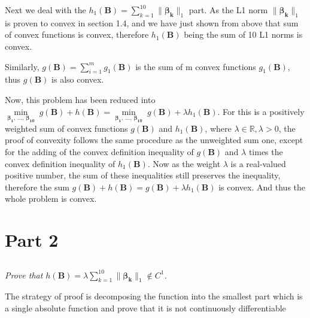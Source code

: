 \documentclass[12pt]{article}
\numberwithin{equation}{section}
\theoremstyle{remark}
\newcommand{\R}{\mathbb R} %
\newcommand{\vect}[1]{\boldsymbol{#1}}
\newcommand{\norm}[2]{\|#1\|_{#2}}
\begin{document}
\medskip
Next we deal with the $h_{1}(\vect{B}) = \sum\limits_{k = 1}^{10} \norm{\vect{\beta_k}}{1}$ part. As the L1 norm $\norm{\vect{\beta_k}}{1}$ is proven to convex in section 1.4, and we have just shown from above that sum of convex functions is convex, therefore $h_{1}(\vect{B})$ being the sum of 10 L1 norms is convex.

\medskip
Similarly, $g(\vect{B}) = \sum\limits_{i = 1}^m g_{1}(\vect{B})$ is the sum of m convex functions $g_{1}(\vect{B})$, thus $g(\vect{B})$ is also convex.

\medskip
Now, this problem has been reduced into $\min\limits_{\vect{\beta_1}, \, \ldots, \, \vect{\beta_{10}}} \; g(\vect{B}) + h(\vect{B}) = \min\limits_{\vect{\beta_1}, \, \ldots, \, \vect{\beta_{10}}} \; g(\vect{B}) + \lambda h_{1}(\vect{B})$. For this is a positively weighted sum of convex functions $g(\vect{B})$ and $h_{1}(\vect{B})$, where $\lambda \in \R, \lambda > 0$, the proof of convexity follows the same procedure as the unweighted sum one, except for the adding of the convex definition inequality of $g(\vect{B})$ and $\lambda$ times the convex definition inequality of $h_{1}(\vect{B})$. Now as the weight $\lambda$ is a real-valued positive number, the sum of these inequalities still preserves the inequality, therefore the sum $g(\vect{B}) + h(\vect{B}) = g(\vect{B}) + \lambda h_{1}(\vect{B})$ is convex. And thus the whole problem is convex.

\section{Part 2}
\subsection{}
\textit{Prove that $h(\vect{B}) = \lambda\sum\limits_{k = 1}^{10} \norm{\vect{\beta_k}}{1}\notin{C^1}$.}

\medskip
The strategy of proof is decomposing the function into the smallest part which is a single absolute function and prove that it is not continuously differentiable
\end{document}
